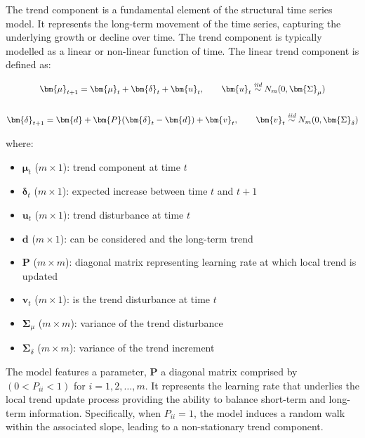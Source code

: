     The trend component is a fundamental element of the structural time series model.
    It represents the long-term movement of the time series, capturing the underlying growth or decline over time.
    The trend component is typically modelled as a linear or non-linear function of time.
    The linear trend component is defined as:

    \begin{gather}
        \bm{\mu}_{t+1} = \bm{\mu}_{t} + \bm{\delta}_{t} + \bm{u}_{t},
            \qquad \bm{u}_{t} \stackrel{\textit{iid}}{\sim} N_{m}(0, \bm{\Sigma}_{\mu}) \\
        \notag \\
        \bm{\delta}_{t+1} = \bm{d} + \bm{P}(\bm{\delta}_{t} - \bm{d}) + \bm{v}_{t},
            \qquad \bm{v}_{t} \stackrel{\textit{iid}}{\sim} N_{m}(0, \bm{\Sigma}_{\delta})
        \label{eq:group}
    \end{gather}

    where:
    \begin{itemize}
        \item $\bm{\mu}_{t}$ ($m \times 1$): trend component at time $t$
        \item $\bm{\delta}_{t}$ ($m \times 1$): expected increase between time $t$ and $t+1$
        \item $\bm{u}_{t}$ ($m \times 1$): trend disturbance at time $t$
        \item $\bm{d}$ ($m \times 1$): can be considered and the long-term trend
        \item $\bm{P}$ ($m \times m$): diagonal matrix representing learning rate at which local trend is updated
        \item $\bm{v}_{t}$ ($m \times 1$): is the trend disturbance at time $t$
        \item $\bm{\Sigma}_{\mu}$ ($m \times m$): variance of the trend disturbance
        \item $\bm{\Sigma}_{\delta}$ ($m \times m$): variance of the trend increment
    \end{itemize}

    The model features a parameter, $\bm{P}$ a diagonal matrix comprised by $(0 < P_{ii} < 1)$ for $i = 1, 2, \ldots, m$.
    It represents the learning rate that underlies the local trend update process providing the ability to balance
    short-term and long-term information.
    Specifically, when $P_{ii} = 1$, the model induces a random walk within the associated slope,
    leading to a non-stationary trend component.

